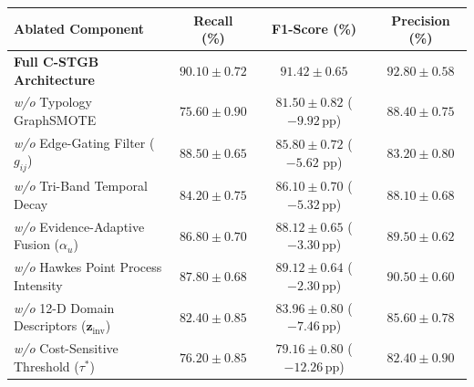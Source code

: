 \begin{table}[t]
{\begin{tabular}{lcccccc}
\midrule
\textbf{Ablated Component} & \multicolumn{2}{c}{\textbf{Recall (\%)}} & \multicolumn{2}{c}{\textbf{F1-Score (\%)}} & \multicolumn{2}{c}{\textbf{Precision (\%)}} \\
\midrule
\textbf{Full C-STGB Architecture} & \multicolumn{2}{c}{$\mathbf{90.10 \pm 0.72}$} & \multicolumn{2}{c}{$\mathbf{91.42 \pm 0.65}$} & \multicolumn{2}{c}{$\mathbf{92.80 \pm 0.58}$} \\
\textit{w/o} Typology GraphSMOTE & \multicolumn{2}{c}{$75.60 \pm 0.90$} & \multicolumn{2}{c}{$81.50 \pm 0.82$ ($-9.92$\,pp)} & \multicolumn{2}{c}{$88.40 \pm 0.75$} \\
\textit{w/o} Edge-Gating Filter ($g_{ij}$) & \multicolumn{2}{c}{$88.50 \pm 0.65$} & \multicolumn{2}{c}{$85.80 \pm 0.72$ ($-5.62\text{ pp}$)} & \multicolumn{2}{c}{$83.20 \pm 0.80$} \\
\textit{w/o} Tri-Band Temporal Decay & \multicolumn{2}{c}{$84.20 \pm 0.75$} & \multicolumn{2}{c}{$86.10 \pm 0.70$ ($-5.32$\,pp)} & \multicolumn{2}{c}{$88.10 \pm 0.68$} \\
\textit{w/o} Evidence-Adaptive Fusion ($\alpha_u$) & \multicolumn{2}{c}{$86.80 \pm 0.70$} & \multicolumn{2}{c}{$88.12 \pm 0.65$ ($-3.30$\,pp)} & \multicolumn{2}{c}{$89.50 \pm 0.62$} \\
\textit{w/o} Hawkes Point Process Intensity & \multicolumn{2}{c}{$87.80 \pm 0.68$} & \multicolumn{2}{c}{$89.12 \pm 0.64$ ($-2.30$\,pp)} & \multicolumn{2}{c}{$90.50 \pm 0.60$} \\
\textit{w/o} 12-D Domain Descriptors ($\mathbf{z}_{\text{inv}}$) & \multicolumn{2}{c}{$82.40 \pm 0.85$} & \multicolumn{2}{c}{$83.96 \pm 0.80$ ($-7.46$\,pp)} & \multicolumn{2}{c}{$85.60 \pm 0.78$} \\
\textit{w/o} Cost-Sensitive Threshold ($\tau^*$) & \multicolumn{2}{c}{$76.20 \pm 0.85$} & \multicolumn{2}{c}{$79.16 \pm 0.80$ ($-12.26$\,pp)} & \multicolumn{2}{c}{$82.40 \pm 0.90$} \\
\bottomrule
\end{tabular}%
}
\end{table}

